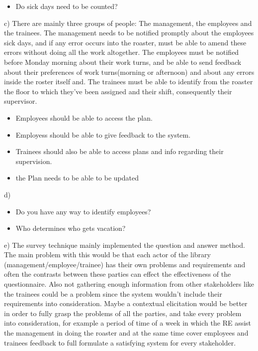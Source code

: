 \begin{elenco}
\begin{itemize}
		\item Do sick days need to be counted?
	\end{itemize}
	\item c) There are mainly three groups of people: The management, the employees and the trainees. The management needs to be notified promptly about the employees sick days, and if any error occurs into the roaster, must be able to amend these errors without doing all the work altogether. The employees must be notified before Monday morning about their work turns, and be able to send feedback about their preferences of work turns(morning or afternoon) and about any errors inside the roster itself and. The trainees must be able to identify from the roaster the floor to which they've been assigned and their shift, consequently their supervisor. 
	\begin{itemize}
		\item Employees should be able to access the plan.
		\item Employess should be able to give feedback to the system.
		\item Trainees should also be able to access plans and info regarding their supervision.
		\item the Plan needs to be able to be updated
	\end{itemize}
	\item d) 
	\begin{itemize}
	\item Do you have any way to identify employees? 
	\item Who determines who gets vacation?
	\end{itemize}
	\item e) The survey technique mainly implemented the question and answer method. The main problem with this would be that each actor of the library (management/employee/trainee) has their own problems and requirements and often the contrasts between these parties can effect the effectiveness of the questionnaire. Also not gathering enough information from other stakeholders like the trainees could be a problem since the system wouldn't include their requirements into consideration. Maybe a contextual elicitation would be better in order to fully grasp the problems of all the parties, and take every problem into consideration, for example a period of time of a week in which the RE assist the management in doing the roaster and at the same time cover employees and trainees feedback to full formulate a satisfying system for every stakeholder.
\end{elenco}
